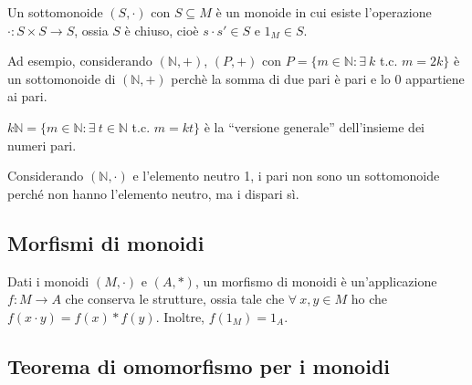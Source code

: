 Un sottomonoide $(S, \cdot)$ con $S \subseteq M$ \`e un monoide in cui esiste l'operazione $\cdot : S \times S \to S$, ossia $S$ \`e chiuso, cio\`e $s \cdot s' \in S$ e $1_M \in S$.

Ad esempio, considerando $(\mathbb{N}, +)$, $(P, +)$ con $P = \{ m \in \mathbb{N} : \exists \ k $ t.c. $m = 2k \}$ \`e un sottomonoide di $(\mathbb{N},+)$ perch\`e la somma di due pari \`e pari e lo 0 appartiene ai pari.

$k \mathbb{N} = \{ m \in \mathbb{N} : \exists \ t \in \mathbb{N} $ t.c. $ m = k t\}$ \`e la ``versione generale'' dell'insieme dei numeri pari.

Considerando $(\mathbb{N}, \cdot)$ e l'elemento neutro 1, i pari non sono un sottomonoide perch\'e non hanno l'elemento neutro, ma i dispari s\`i.

\subsection{Morfismi di monoidi}

\begin{defn}
Dati i monoidi $(M, \cdot)$ e $(A, \ast)$, un morfismo di monoidi \`e un'applicazione $f : M \to A$ che conserva le strutture, ossia tale che $\forall \ x,y \in M $ ho che $f(x \cdot y) = f(x) \ast f(y)$. Inoltre, $f(1_M) = 1_A$.
\end{defn}

\subsection{Teorema di omomorfismo per i monoidi\label{omomorfismo_monoidi}}

